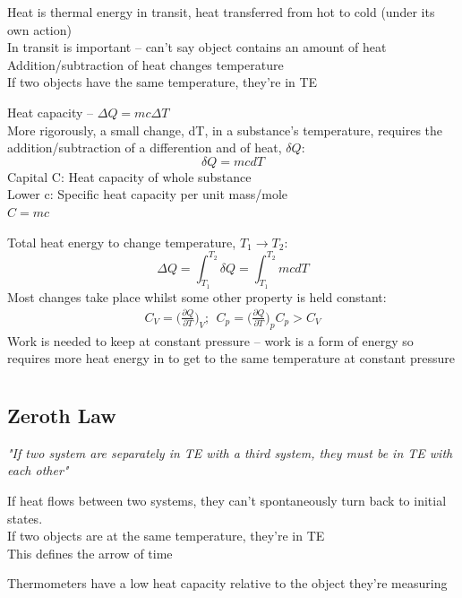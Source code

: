 \documentclass[a4paper, 11pt, normalem]{report}
\newcommand\p{\partial}
\begin{document}
Heat is thermal energy in transit, heat transferred from hot to cold (under its own action) \\
In transit is important -- can't say object contains an amount of heat \\
Addition/subtraction of heat changes temperature \\
If two objects have the same temperature, they're in TE

Heat capacity -- $\Delta Q = mc\Delta T$ \\
More rigorously, a small change, dT, in a substance's temperature, requires the addition/subtraction of a differention and of heat,  $\delta Q$:
\begin{equation*}
    \delta Q = mcdT
\end{equation*}
Capital C: Heat capacity of whole substance \\
Lower c: Specific heat capacity per unit mass/mole \\
$C = mc$

Total heat energy to change temperature, $T_1 \to T_2$:
\begin{equation*}
    \Delta Q = \int_{T_{1}}^{T_{2}} \delta Q = \int_{T_1}^{T_2} mcdT
\end{equation*}
Most changes take place whilst some other property is held constant:
\begin{gather*}
    C_{V} = \Big(\frac{\p Q}{\p T}\Big)_{V};~~ C_{p} = \Big(\frac{\p Q}{\p T}\Big)_{p}
    C_{p} > C_{V}
\end{gather*}
Work is needed to keep at constant pressure -- work is a form of energy so requires more heat energy in to get to the same temperature at constant pressure

\chapter{}
\section{Zeroth Law}
\emph{"If two system are separately in TE with a third system, they must be in TE with each other"}

If heat flows between two systems, they can't spontaneously turn back to initial states. \\
If two objects are at the same temperature, they're in TE \\
This defines the arrow of time

Thermometers have a low heat capacity relative to the object they're measuring
\end{document}
